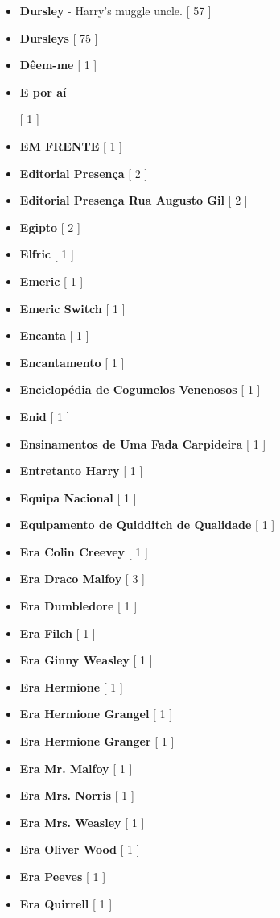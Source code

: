 \documentclass[a4paper]{article}
\begin{document}
{\begin{itemize}
	\item \textbf{Dursley} - Harry's muggle uncle. [ 57 ]
	\item \textbf{Dursleys} [ 75 ]
	\item \textbf{Dêem-me} [ 1 ]
	\item \hypertarget{E}{\textbf{E por aí}} [ 1 ]
	\item \textbf{EM FRENTE} [ 1 ]
	\item \textbf{Editorial Presença} [ 2 ]
	\item \textbf{Editorial Presença Rua Augusto Gil} [ 2 ]
	\item \textbf{Egipto} [ 2 ]
	\item \textbf{Elfric} [ 1 ]
	\item \textbf{Emeric} [ 1 ]
	\item \textbf{Emeric Switch} [ 1 ]
	\item \textbf{Encanta} [ 1 ]
	\item \textbf{Encantamento} [ 1 ]
	\item \textbf{Enciclopédia de Cogumelos Venenosos} [ 1 ]
	\item \textbf{Enid} [ 1 ]
	\item \textbf{Ensinamentos de Uma Fada Carpideira} [ 1 ]
	\item \textbf{Entretanto Harry} [ 1 ]
	\item \textbf{Equipa Nacional} [ 1 ]
	\item \textbf{Equipamento de Quidditch de Qualidade} [ 1 ]
	\item \textbf{Era Colin Creevey} [ 1 ]
	\item \textbf{Era Draco Malfoy} [ 3 ]
	\item \textbf{Era Dumbledore} [ 1 ]
	\item \textbf{Era Filch} [ 1 ]
	\item \textbf{Era Ginny Weasley} [ 1 ]
	\item \textbf{Era Hermione} [ 1 ]
	\item \textbf{Era Hermione Grangel} [ 1 ]
	\item \textbf{Era Hermione Granger} [ 1 ]
	\item \textbf{Era Mr. Malfoy} [ 1 ]
	\item \textbf{Era Mrs. Norris} [ 1 ]
	\item \textbf{Era Mrs. Weasley} [ 1 ]
	\item \textbf{Era Oliver Wood} [ 1 ]
	\item \textbf{Era Peeves} [ 1 ]
	\item \textbf{Era Quirrell} [ 1 ]

\end{itemize}}
\end{document}
